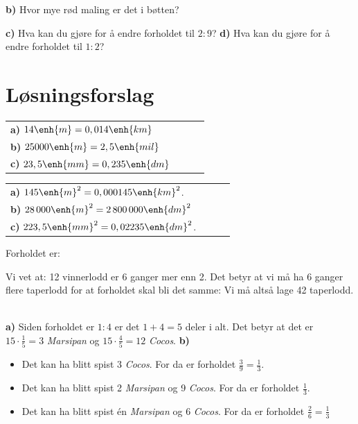 \textbf{b)} Hvor mye rød maling er det i bøtten?\os

\textbf{c)} Hva kan du gjøre for å endre forholdet til $ 2:9 $?\os
\textbf{d)} Hva kan du gjøre for å endre forholdet til $ 1:2 $?

\newpage
\section*{Løsningsforslag}
 \os

\begin{tabular}{@{}l l l l}
	\textbf{a)} $ 14\enh{m}=0,014\enh{km} $\\
	\textbf{b)} $ 25000\enh{m}=2,5\enh{mil} $\\
	\textbf{c)} $ 23,5\enh{mm}=0,235\enh{dm} $
\end{tabular}\vsk

\os
\begin{tabular}{@{}l l l l}
	\textbf{a)} $ 145\enh{m}^2=0,000145\enh{km}^2 $.\\
	\textbf{b)} $ 28\,000\enh{m}^2=2\,800\,000\enh{dm}^2 $\\
	\textbf{c)} $ 223,5\enh{mm}^2=0,02235\enh{dm}^2 $.
\end{tabular}\vsk

Forholdet er:

Vi vet at:
12 vinnerlodd er 6 ganger mer enn 2. Det betyr at vi må ha 6 ganger flere taperlodd for at forholdet skal bli det samme:
Vi må altså lage 42 taperlodd.\vsk

\\
\textbf{a)}
Siden forholdet er $ {1:4} $ er det $ {1+4=5} $ deler i alt. Det betyr at det er $ {15\cdot\frac{1}{5}=}3 $ \textsl{Marsipan} og $ {15\cdot\frac{4}{5}=12} $ \textsl{Cocos}.\os
\textbf{b)} 
\begin{itemize}
	\item Det kan ha blitt spist 3 \textsl{Cocos}. For da er forholdet $ {\frac{3}{9}=\frac{1}{3}} $.
	\item Det kan ha blitt spist 2 \textsl{Marsipan} og 9 \textsl{Cocos}. For da er forholdet $ {\frac{1}{3}} $.	
	\item Det kan ha blitt spist én \textsl{Marsipan} og 6 \textsl{Cocos}. For da er forholdet $ {\frac{2}{6}=\frac{1}{3}} $
\end{itemize} \vsk


